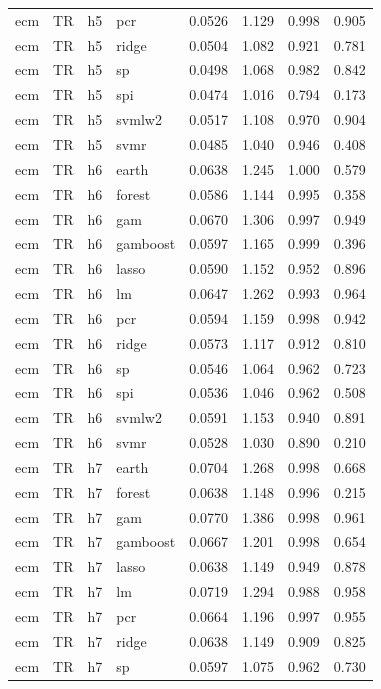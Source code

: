\begin{ThreePartTable}
\begin{longtable}[t]{llclcccc}
ecm & TR & h5 & pcr & 0.0526 & 1.129 & 0.998 & 0.905\\
ecm & TR & h5 & ridge & 0.0504 & 1.082 & 0.921 & 0.781\\
ecm & TR & h5 & sp & 0.0498 & 1.068 & 0.982 & 0.842\\
ecm & TR & h5 & spi & 0.0474 & 1.016 & 0.794 & 0.173\\
ecm & TR & h5 & svmlw2 & 0.0517 & 1.108 & 0.970 & 0.904\\
ecm & TR & h5 & svmr & 0.0485 & 1.040 & 0.946 & 0.408\\
\addlinespace
ecm & TR & h6 & earth & 0.0638 & 1.245 & 1.000 & 0.579\\
ecm & TR & h6 & forest & 0.0586 & 1.144 & 0.995 & 0.358\\
ecm & TR & h6 & gam & 0.0670 & 1.306 & 0.997 & 0.949\\
ecm & TR & h6 & gamboost & 0.0597 & 1.165 & 0.999 & 0.396\\
ecm & TR & h6 & lasso & 0.0590 & 1.152 & 0.952 & 0.896\\
ecm & TR & h6 & lm & 0.0647 & 1.262 & 0.993 & 0.964\\
ecm & TR & h6 & pcr & 0.0594 & 1.159 & 0.998 & 0.942\\
ecm & TR & h6 & ridge & 0.0573 & 1.117 & 0.912 & 0.810\\
ecm & TR & h6 & sp & 0.0546 & 1.064 & 0.962 & 0.723\\
ecm & TR & h6 & spi & 0.0536 & 1.046 & 0.962 & 0.508\\
ecm & TR & h6 & svmlw2 & 0.0591 & 1.153 & 0.940 & 0.891\\
ecm & TR & h6 & svmr & 0.0528 & 1.030 & 0.890 & 0.210\\
\addlinespace
ecm & TR & h7 & earth & 0.0704 & 1.268 & 0.998 & 0.668\\
ecm & TR & h7 & forest & 0.0638 & 1.148 & 0.996 & 0.215\\
ecm & TR & h7 & gam & 0.0770 & 1.386 & 0.998 & 0.961\\
ecm & TR & h7 & gamboost & 0.0667 & 1.201 & 0.998 & 0.654\\
ecm & TR & h7 & lasso & 0.0638 & 1.149 & 0.949 & 0.878\\
ecm & TR & h7 & lm & 0.0719 & 1.294 & 0.988 & 0.958\\
ecm & TR & h7 & pcr & 0.0664 & 1.196 & 0.997 & 0.955\\
ecm & TR & h7 & ridge & 0.0638 & 1.149 & 0.909 & 0.825\\
ecm & TR & h7 & sp & 0.0597 & 1.075 & 0.962 & 0.730\\

\end{longtable}
\end{ThreePartTable}
